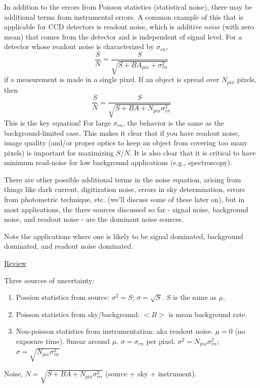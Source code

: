 \documentclass[12pt]{article}
\begin{document}
In addition to the errors from Poisson statistics (statistical noise),
there may be additional terms from instrumental errors. A common
example of this that is applicable for CCD detectors is readout noise,
which is additive \emph{noise} (with zero mean) that comes from the detector
and is independent of signal level. For a detector whose readout noise
is characterized by $\sigma_{rn}$,
$$ \frac{S}{N} = \frac{S}{\sqrt{S+BA_{pix}+\sigma^2_{rn}}} $$
if a measurement is made in a single pixel. If an object is spread
over $N_{pix}$ pixels, then
$$ \boxed{
 \frac{S}{N} = \frac{S}{\sqrt{S+BA+N_{pix}\sigma^2_{rn}}}
 } $$
\textcolor{myBlue}{This is the key equation!}
For large $\sigma_{rn}$, the behavior is the same as the
background-limited case. This makes it clear that if you have readout
noise, image quality (and/or proper optics to keep an object from
covering too many pixels) is important for maximizing $S/N$. It is
also clear that it is critical to have minimum read-noise for low
background applications (e.g., spectroscopy).

There are other possible additional terms in the noise equation,
arising from things like dark current, digitization noise, errors in
sky determination, errors from photometric technique, etc. (we'll
discuss some of these later on), but in most applications, the three
sources discussed so far - signal noise, background noise, and readout
noise - are the dominant noise sources.

Note the applications where one is likely to be signal dominated,
background dominated, and readout noise dominated.

\textcolor{myBlue}{\large \underline{Review}}\normalsize

Three sources of uncertainty:
\begin{enumerate}
    \item Possion statistics from source: $\sigma^2 = S$;
        $\sigma = \sqrt{S}$. $S$ is the same as $\mu$.
    \item Poisson statistics from sky/background:
        $<B>$ is mean background rate.
    \item Non-poisson statistics from instrumentation:
        aka readout noise. $\mu=0$ (no exposure time).
        Smear around $\mu$. $\sigma = \sigma_{rn}$ per pixel.
        $\sigma^2 = N_{pix}\sigma_{rn}^2$;
        $\sigma = \sqrt{N_{pix}\sigma_{rn}^2}$
\end{enumerate}
Noise, $N = \sqrt{S+BA+N_{pix}\sigma_{rn}^2}$
(source + sky + instrument).
\end{document}
